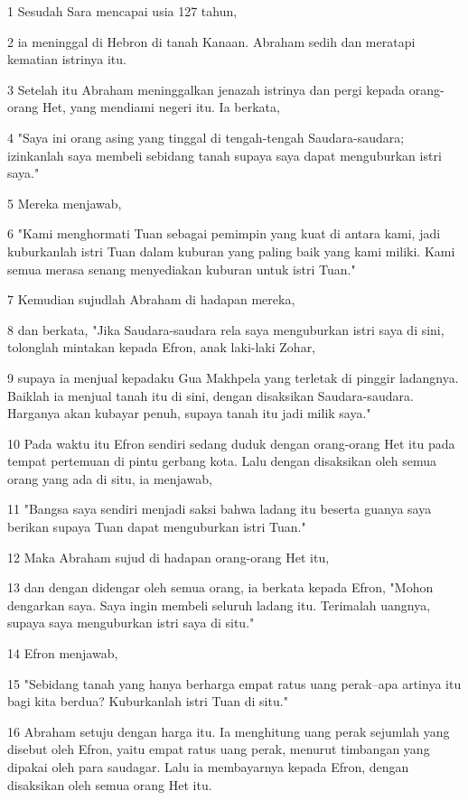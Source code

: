 \par 1 Sesudah Sara mencapai usia 127 tahun,
\par 2 ia meninggal di Hebron di tanah Kanaan. Abraham sedih dan meratapi kematian istrinya itu.
\par 3 Setelah itu Abraham meninggalkan jenazah istrinya dan pergi kepada orang-orang Het, yang mendiami negeri itu. Ia berkata,
\par 4 "Saya ini orang asing yang tinggal di tengah-tengah Saudara-saudara; izinkanlah saya membeli sebidang tanah supaya saya dapat menguburkan istri saya."
\par 5 Mereka menjawab,
\par 6 "Kami menghormati Tuan sebagai pemimpin yang kuat di antara kami, jadi kuburkanlah istri Tuan dalam kuburan yang paling baik yang kami miliki. Kami semua merasa senang menyediakan kuburan untuk istri Tuan."
\par 7 Kemudian sujudlah Abraham di hadapan mereka,
\par 8 dan berkata, "Jika Saudara-saudara rela saya menguburkan istri saya di sini, tolonglah mintakan kepada Efron, anak laki-laki Zohar,
\par 9 supaya ia menjual kepadaku Gua Makhpela yang terletak di pinggir ladangnya. Baiklah ia menjual tanah itu di sini, dengan disaksikan Saudara-saudara. Harganya akan kubayar penuh, supaya tanah itu jadi milik saya."
\par 10 Pada waktu itu Efron sendiri sedang duduk dengan orang-orang Het itu pada tempat pertemuan di pintu gerbang kota. Lalu dengan disaksikan oleh semua orang yang ada di situ, ia menjawab,
\par 11 "Bangsa saya sendiri menjadi saksi bahwa ladang itu beserta guanya saya berikan supaya Tuan dapat menguburkan istri Tuan."
\par 12 Maka Abraham sujud di hadapan orang-orang Het itu,
\par 13 dan dengan didengar oleh semua orang, ia berkata kepada Efron, "Mohon dengarkan saya. Saya ingin membeli seluruh ladang itu. Terimalah uangnya, supaya saya menguburkan istri saya di situ."
\par 14 Efron menjawab,
\par 15 "Sebidang tanah yang hanya berharga empat ratus uang perak--apa artinya itu bagi kita berdua? Kuburkanlah istri Tuan di situ."
\par 16 Abraham setuju dengan harga itu. Ia menghitung uang perak sejumlah yang disebut oleh Efron, yaitu empat ratus uang perak, menurut timbangan yang dipakai oleh para saudagar. Lalu ia membayarnya kepada Efron, dengan disaksikan oleh semua orang Het itu.
